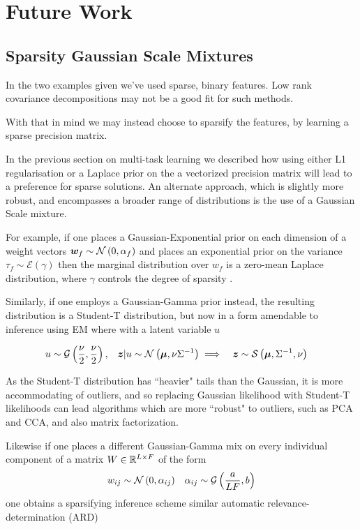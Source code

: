 

\section{Future Work}
\subsection{Sparsity Gaussian Scale Mixtures}
In the two examples given we've used sparse, binary features. Low rank covariance decompositions may not be a good fit for such methods.

With that in mind we may instead choose to sparsify the features, by learning a sparse precision matrix.

In the previous section on multi-task learning we described how using either L1 regularisation or a Laplace prior on the a vectorized precision matrix will lead to a preference for sparse solutions. An alternate approach, which is slightly more robust, and encompasses a broader range of distributions is the use of a Gaussian Scale mixture.

For example, if one places a Gaussian-Exponential prior on each dimension of a weight vectors $\bm w_f \sim \mathcal{N} \left( {0}, {\alpha_f} \right)$ and places an exponential prior on the variance $\tau_f \sim \mathcal{E}\left(\gamma\right)$ then the marginal distribution over $w_f$ is a zero-mean Laplace distribution, where $\gamma$ controls the degree of sparsity \cite{Figueiredo2003}.

Similarly, if one employs a Gaussian-Gamma prior instead, the resulting distribution is a Student-T distribution, but now in a form amendable to inference using EM where with a latent variable $u$

\begin{align}
u & \sim \mathcal{G}\left(\frac{\nu}{2}, \frac{\nu}{2} \right) ,
& \bm z|u \sim \mathcal{N} \left( {\bm \mu}, {\nu {\Sigma}^{-1}} \right) 
& \implies & \bm z & \sim \mathcal{S}\left(\bm \mu, {\Sigma}^{-1}, \nu \right)
\end{align}

As the Student-T distribution has ``heavier" tails than the Gaussian, it is more accommodating of outliers, and so replacing Gaussian likelihood with Student-T likelihoods can lead algorithms which are more ``robust" to outliers, such as PCA and CCA\cite{Archambeau2006a}, and also matrix factorization\cite{Balaji2011}.

Likewise if one places a different Gaussian-Gamma mix on every individual component of a matrix $W \in { \mathbb{R}^{L \times F} }$ of the form
\begin{align}
w_{ij} &\sim \mathcal{N} \left( {0}, {\alpha_{ij}} \right) & \alpha_{ij} \sim \mathcal{G}\left(\frac{a}{LF}, b\right)
\end{align}
one obtains a sparsifying inference scheme\cite{Archambeau2009a} similar automatic relevance-determination (ARD)

